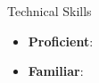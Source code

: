 \documentclass[]{mcdowellcv}
\begin{document}
	\begin{cvsection}{Technical Skills}
		\begin{cvsubsection}{}{}{}	
		    \begin{itemize}
				\item \textbf{Proficient}: 
				\item \textbf{Familiar}: 
			\end{itemize}
		\end{cvsubsection}
	\end{cvsection}
\end{document}
